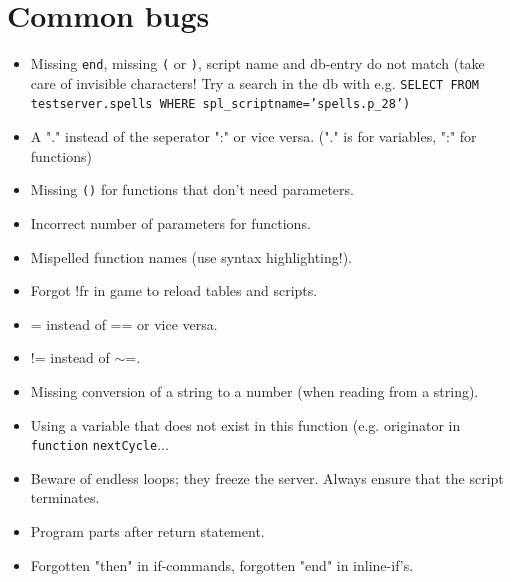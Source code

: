 \documentclass[a4paper,10pt,makeidx]{scrreprt}
\begin{document}
\chapter{Common bugs}
\begin{itemize}
\item Missing {\tt end}, missing {\tt (} or {\tt )}, script name and db-entry do not match (take care of invisible characters! Try a search in the db with e.g. \texttt{SELECT FROM testserver.spells WHERE spl\_scriptname='spells.p\_28')}
\item A "." instead of the seperator ":" or vice versa. ("." is for variables, ":" for functions)
\item Missing \texttt{()} for functions that don't need parameters.
\item Incorrect number of parameters for functions.
\item Mispelled function names (use syntax highlighting!).
\item Forgot !fr in game to reload tables and scripts.
\item = instead of == or vice versa.
\item != instead of $\sim$=.
\item Missing conversion of a string to a number (when reading from a string).
\item Using a variable that does not exist in this function (e.g. originator in \texttt{function} \texttt{nextCycle}{...}
\item Beware of endless loops; they freeze the server. Always ensure that the script terminates.
\item Program parts after return statement.
\item Forgotten "then" in if-commands, forgotten "end" in inline-if's.
\end{itemize}

\appendix
\end{document}
